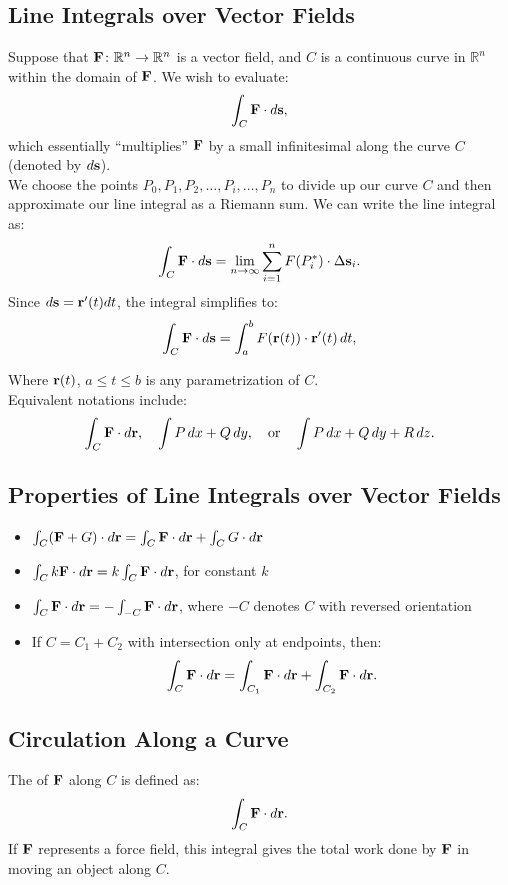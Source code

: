 \subsection{Line Integrals over Vector Fields}
Suppose that \( \mathbf{F} \colon \mathbb{R}^n \to \mathbb{R}^n \) is a vector field, and \( C \) is a continuous curve in \( \mathbb{R}^n \) within the domain of \( \mathbf{F} \). We wish to evaluate:
\[ \int_C \mathbf{F} \cdot d\mathbf{s}, \]
which essentially ``multiplies'' \(\mathbf{F}\) by a small infinitesimal along the curve \(C\) (denoted by \(d\mathbf{s}\)). \\

We choose the points \(P_{0}, P_{1}, P_{2}, \ldots, P_{i},\ldots, P_{n}\) to divide up our curve \(C\) and then approximate our line integral as a Riemann sum. We can write the line integral as:
\[ \int_C \mathbf{F} \cdot d\mathbf{s} = \lim_{n\to\infty} \sum_{i=1}^{n} F(P^*_i) \cdot \Delta \mathbf{s}_i. \]
Since \( d\mathbf{s} = \mathbf{r}'(t) dt \), the integral simplifies to:
\[ \int_C \mathbf{F} \cdot d\mathbf{s} = \int_a^b F(\mathbf{r}(t)) \cdot \mathbf{r}'(t) \, dt, \]

Where \( \mathbf{r}(t) \), \(a \leq t \leq b\) is any parametrization of \(C\). \\ 

Equivalent notations include:
\[ \int_C \mathbf{F} \cdot d\mathbf{r}, \quad \int P \, dx + Q \, dy, \quad \text{or} \quad \int P \, dx + Q \, dy + R \, dz. \]

\subsection{Properties of Line Integrals over Vector Fields}
\begin{itemize}
    \item \( \int_C (\mathbf{F} + G) \cdot d\mathbf{r} = \int_C \mathbf{F} \cdot d\mathbf{r} + \int_C G \cdot d\mathbf{r} \)
    \item \( \int_C k\mathbf{F} \cdot d\mathbf{r} = k \int_C \mathbf{F} \cdot d\mathbf{r} \), for constant \( k \)
    \item \( \int_C \mathbf{F} \cdot d\mathbf{r} = - \int_{-C} \mathbf{F} \cdot d\mathbf{r} \), where \( -C \) denotes \( C \) with reversed orientation
    \item If \( C = C_1 + C_2 \) with intersection only at endpoints, then:
    \[ \int_C \mathbf{F} \cdot d\mathbf{r} = \int_{C_1} \mathbf{F} \cdot d\mathbf{r} + \int_{C_2} \mathbf{F} \cdot d\mathbf{r}. \]
\end{itemize}

\subsection{Circulation Along a Curve}
The  of \( \mathbf{F} \) along \( C \) is defined as:
\[ \int_C \mathbf{F} \cdot d\mathbf{r}. \]
If \( \mathbf{F} \) represents a force field, this integral gives the total work done by \( \mathbf{F} \) in moving an object along \( C \).

